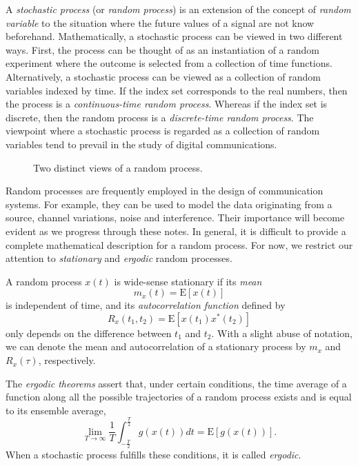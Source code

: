 A \emph{stochastic process} (or \emph{random process}) is an extension of the concept of \emph{random variable} to the situation where the future values of a signal are not know beforehand.
Mathematically, a stochastic process can be viewed in two different ways.
First, the process can be thought of as an instantiation of a random experiment where the outcome is selected from a collection of time functions.
Alternatively, a stochastic process can be viewed as a collection of random variables indexed by time.
If the index set corresponds to the real numbers, then the process is a \emph{continuous-time random process}.
Whereas if the index set is discrete, then the random process is a \emph{discrete-time random process}.
The viewpoint where a stochastic process is regarded as a collection of random variables tend to prevail in the study of digital communications.
\begin{figure}[htbp]
\begin{center}
\caption{Two distinct views of a random process.}
\label{figure:RandomProcess}
\end{center}
\end{figure}

Random processes are frequently employed in the design of communication systems.
For example, they can be used to model the data originating from a source, channel variations, noise and interference.
Their importance will become evident as we progress through these notes.
In general, it is difficult to provide a complete mathematical description for a random process.
For now, we restrict our attention to \emph{stationary} and \emph{ergodic} random processes.

\begin{definition}[Stationarity]
A random process $x(t)$ is wide-sense stationary if its \emph{mean}
\begin{equation*}
m_x(t) = \mathrm{E} [x(t)]
\end{equation*}
is independent of time, and its \emph{autocorrelation function} defined by
\begin{equation*}
R_x(t_1, t_2) = \mathrm{E} [x(t_1) x^*(t_2)]
\end{equation*}
only depends on the difference between $t_1$ and $t_2$.
With a slight abuse of notation, we can denote the mean and autocorrelation of a stationary process by $m_x$ and $R_x(\tau)$, respectively.
\end{definition}

\begin{definition}[Ergodicity]
The \emph{ergodic theorems} assert that, under certain conditions, the time average of a function along all the possible trajectories of a random process exists and is equal to its ensemble average,
\begin{equation*}
\lim_{T \rightarrow \infty} \frac{1}{T} \int_{- \frac{T}{2}}^{\frac{T}{2}} g(x(t)) dt
= \mathrm{E}[g(x(t))] .
\end{equation*}
When a stochastic process fulfills these conditions, it is called \emph{ergodic}.
\end{definition}


